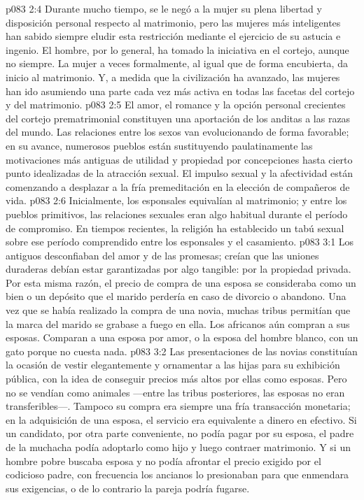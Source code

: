 \vs p083 2:4 Durante mucho tiempo, se le negó a la mujer su plena libertad y disposición personal respecto al matrimonio, pero las mujeres más inteligentes han sabido siempre eludir esta restricción mediante el ejercicio de su astucia e ingenio. El hombre, por lo general, ha tomado la iniciativa en el cortejo, aunque no siempre. La mujer a veces formalmente, al igual que de forma encubierta, da inicio al matrimonio. Y, a medida que la civilización ha avanzado, las mujeres han ido asumiendo una parte cada vez más activa en todas las facetas del cortejo y del matrimonio.
\vs p083 2:5 El amor, el romance y la opción personal crecientes del cortejo prematrimonial constituyen una aportación de los anditas a las razas del mundo. Las relaciones entre los sexos van evolucionando de forma favorable; en su avance, numerosos pueblos están sustituyendo paulatinamente las motivaciones más antiguas de utilidad y propiedad por concepciones hasta cierto punto idealizadas de la atracción sexual. El impulso sexual y la afectividad están comenzando a desplazar a la fría premeditación en la elección de compañeros de vida.
\vs p083 2:6 Inicialmente, los esponsales equivalían al matrimonio; y entre los pueblos primitivos, las relaciones sexuales eran algo habitual durante el período de compromiso. En tiempos recientes, la religión ha establecido un tabú sexual sobre ese período comprendido entre los esponsales y el casamiento.
\vs p083 3:1 Los antiguos desconfiaban del amor y de las promesas; creían que las uniones duraderas debían estar garantizadas por algo tangible: por la propiedad privada. Por esta misma razón, el precio de compra de una esposa se consideraba como un bien o un depósito que el marido perdería en caso de divorcio o abandono. Una vez que se había realizado la compra de una novia, muchas tribus permitían que la marca del marido se grabase a fuego en ella. Los africanos aún compran a sus esposas. Comparan a una esposa por amor, o la esposa del hombre blanco, con un gato porque no cuesta nada.
\vs p083 3:2 Las presentaciones de las novias constituían la ocasión de vestir elegantemente y ornamentar a las hijas para su exhibición pública, con la idea de conseguir precios más altos por ellas como esposas. Pero no se vendían como animales ---entre las tribus posteriores, las esposas no eran transferibles---. Tampoco su compra era siempre una fría transacción monetaria; en la adquisición de una esposa, el servicio era equivalente a dinero en efectivo. Si un candidato, por otra parte conveniente, no podía pagar por su esposa, el padre de la muchacha podía adoptarlo como hijo y luego contraer matrimonio. Y si un hombre pobre buscaba esposa y no podía afrontar el precio exigido por el codicioso padre, con frecuencia los ancianos lo presionaban para que enmendara sus exigencias, o de lo contrario la pareja podría fugarse.
